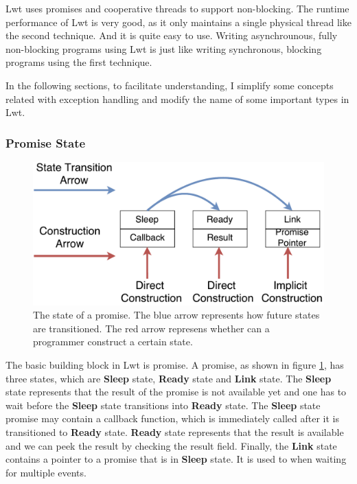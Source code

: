 Lwt uses promises and cooperative threads to support non-blocking. The runtime
performance of Lwt is very good, as it only maintains a single physical thread
like the second technique. And it is quite easy to use. Writing asynchrounous,
fully non-blocking programs using Lwt is just like writing synchronous, blocking
programs using the first technique.



In the following sections, to facilitate understanding, I simplify some concepts
related with exception handling and modify the name of some important types in
Lwt.

\subsubsection{Promise State}

\begin{figure}[!h]
        \centering
        \includegraphics[width=1\columnwidth]{figure/promise-state.pdf}
        \caption{The state of a promise. The blue arrow represents how future
          states are transitioned. The red arrow represens whether can a
          programmer construct a certain state.}
        \label{fig:promise-state}
\end{figure}

The basic building block in Lwt is promise. A promise, as shown in figure
\ref{fig:promise-state}, has three states, which are \textbf{Sleep} state,
\textbf{Ready} state and \textbf{Link} state. The \textbf{Sleep} state
represents that the result of the promise is not available yet and one has to
wait before the \textbf{Sleep} state transitions into \textbf{Ready} state. The
\textbf{Sleep} state promise may contain a callback function, which is
immediately called after it is transitioned to \textbf{Ready}
state. \textbf{Ready} state represents that the result is available and we can
peek the result by checking the result field. Finally, the \textbf{Link} state
contains a pointer to a promise that is in \textbf{Sleep} state. It is used to
when waiting for multiple events.


